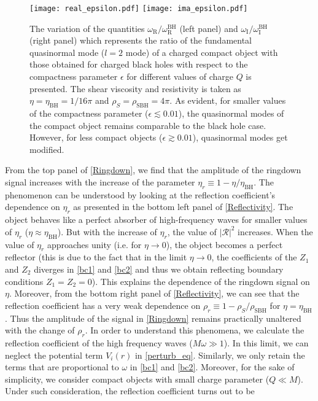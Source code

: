 \documentclass[aps,prd,twocolumn,floatfix,noshowpacs,tightenlines,noshowkeys,superscriptaddress,amsmath,amssymb,
nofootinbib]{revtex4-1}
\renewcommand\[{\begin{equation}}
\renewcommand\]{\end{equation}}
\begin{document}
\begin{figure*}[t]
	\centering
	\texttt{[image: real\_epsilon.pdf]}
	\endminipage\hfill
	\texttt{[image: ima\_epsilon.pdf]}
	\endminipage
	\caption{The variation of the quantities $\omega_{\textrm{R}}/\omega_{\textrm{R}}^{\textrm{BH}}$ (left panel) and $\omega_{\textrm{I}}/\omega_{\textrm{I}}^{\textrm{BH}}$ (right panel) which represents the ratio of the fundamental quasinormal mode ($l=2$ mode) of a charged compact object with those obtained for charged black holes with respect to the compactness parameter $\epsilon$ for different values of charge $Q$ is presented. The shear viscosity and resistivity is taken as $\eta=\eta_{\textrm{BH}}=1/16\pi$ and $\rho_{S}=\rho_{\textrm{SBH}}=4\pi$. As evident, for smaller values of the compactness parameter ($\epsilon\lesssim 0.01$), the quasinormal modes of the compact object remains comparable to the black hole case. However, for less compact objects ($\epsilon\gtrsim 0.01$), quasinormal modes get modified. }\label{epsilon}
\end{figure*}
From the top panel of \autoref{Ringdown}, we find that the amplitude of the ringdown signal increases with the increase of the parameter $\eta_r\equiv1-\eta/\eta_{\textrm{BH}}$. The phenomenon can be understood by looking at the reflection coefficient's dependence on $\eta_r$ as presented in the bottom left panel of \autoref{Reflectivity}. The object behaves like a perfect absorber of high-frequency waves for smaller values of $\eta_r$ ($\eta\approx \eta_{\textrm{BH}}$). But with the increase of $\eta_r$, the value of  $|\mathcal{R}|^2$ increases. When the value of $\eta_r$ approaches unity (i.e. for $\eta\to 0$), the object becomes a perfect reflector (this is due to the fact that in the limit $\eta\to 0$, the coefficients of the $Z_1$ and $Z_2$ diverges in \autoref{bc1} and \autoref{bc2} and thus we obtain reflecting boundary conditions $Z_1=Z_2=0$). This explains the dependence of the ringdown signal on $\eta$. Moreover, from the bottom right panel of \autoref{Reflectivity}, we can see that the reflection coefficient has a very weak dependence on $\rho_r\equiv1-\rho_{S}/\rho_{\textrm{SBH}}$ for $\eta=\eta_{\textrm{BH}}$. Thus the amplitude of the signal in \autoref{Ringdown} remains practically unaltered with the change of  $\rho_r$. In order to understand this phenomena, we calculate the reflection coefficient of the high frequency waves ($M\omega\gg 1$). In this limit, we can neglect the potential term $V_{i}(r)$ in \autoref{perturb_eq}.  Similarly, we only retain the terms that are proportional to $\omega$ in \autoref{bc1} and \autoref{bc2}. Moreover, for the sake of simplicity, we consider compact objects with small charge parameter ($Q\ll M$). Under such consideration, the reflection coefficient turns out to be
\end{document}
